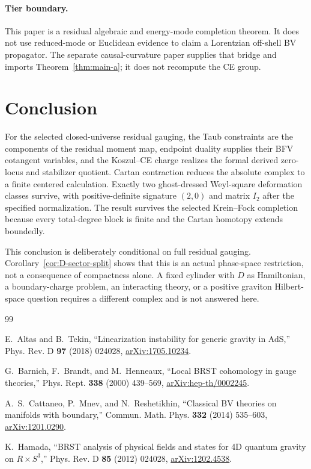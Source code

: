\documentclass[11pt]{article}
\theoremstyle{remark}
\begin{document}
\paragraph{Tier boundary.}
This paper is a residual algebraic and energy-mode completion theorem.  It
does not use reduced-mode or Euclidean evidence to claim a Lorentzian
off-shell BV propagator.  The separate causal-curvature paper supplies that
bridge and imports Theorem~\ref{thm:main-a}; it does not recompute the CE
group.

\section{Conclusion}

For the selected closed-universe residual gauging, the Taub constraints are
the components of the residual moment map, endpoint duality supplies their
BFV cotangent variables, and the Koszul--CE charge realizes the formal
derived zero-locus and stabilizer quotient.  Cartan contraction reduces the
absolute complex to a finite centered calculation.  Exactly two
ghost-dressed Weyl-square deformation classes survive, with positive-definite
signature $(2,0)$ and matrix $I_2$ after the specified normalization.  The
result survives the selected Krein--Fock completion because every
total-degree block is finite and the Cartan homotopy extends boundedly.

This conclusion is deliberately conditional on full residual gauging.
Corollary~\ref{cor:D-sector-split} shows that this is an actual phase-space
restriction, not a consequence of compactness alone.  A fixed cylinder with
$D$ as Hamiltonian, a boundary-charge problem, an interacting theory, or a
positive graviton Hilbert-space question requires a different complex and is
not answered here.

\begin{thebibliography}{99}

E.~Altas and B.~Tekin,
``Linearization instability for generic gravity in AdS,''
Phys. Rev. D \textbf{97} (2018) 024028,
\href{https://arxiv.org/abs/1705.10234}{arXiv:1705.10234}.

G.~Barnich, F.~Brandt, and M.~Henneaux,
``Local BRST cohomology in gauge theories,''
Phys. Rept. \textbf{338} (2000) 439--569,
\href{https://arxiv.org/abs/hep-th/0002245}{arXiv:hep-th/0002245}.

A.~S.~Cattaneo, P.~Mnev, and N.~Reshetikhin,
``Classical BV theories on manifolds with boundary,''
Commun. Math. Phys. \textbf{332} (2014) 535--603,
\href{https://arxiv.org/abs/1201.0290}{arXiv:1201.0290}.

K.~Hamada,
``BRST analysis of physical fields and states for 4D quantum gravity on
$R\times S^3$,''
Phys. Rev. D \textbf{85} (2012) 024028,
\href{https://arxiv.org/abs/1202.4538}{arXiv:1202.4538}.

\end{thebibliography}
\end{document}
